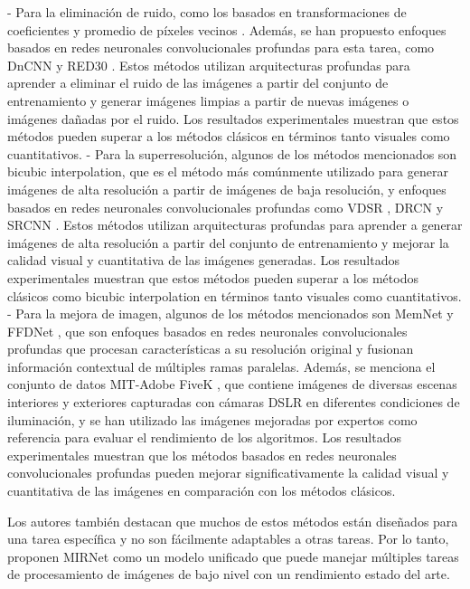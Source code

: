 \documentclass[a4paper,
               ]{jacow}
\begin{document}
- Para la eliminación de ruido, como los basados en transformaciones de coeficientes y promedio de píxeles vecinos \cite{zhang2017beyond}. Además, se han propuesto enfoques basados en redes neuronales convolucionales profundas para esta tarea, como DnCNN \cite{zhang2017beyond} y RED30 \cite{mao2019red30}. Estos métodos utilizan arquitecturas profundas para aprender a eliminar el ruido de las imágenes a partir del conjunto de entrenamiento y generar imágenes limpias a partir de nuevas imágenes o imágenes dañadas por el ruido. Los resultados experimentales muestran que estos métodos pueden superar a los métodos clásicos en términos tanto visuales como cuantitativos.
- Para la superresolución, algunos de los métodos mencionados son bicubic interpolation, que es el método más comúnmente utilizado para generar imágenes de alta resolución a partir de imágenes de baja resolución, y enfoques basados en redes neuronales convolucionales profundas como VDSR \cite{vdsr}, DRCN \cite{kim2016deeply} y SRCNN \cite{dong2016image}. Estos métodos utilizan arquitecturas profundas para aprender a generar imágenes de alta resolución a partir del conjunto de entrenamiento y mejorar la calidad visual y cuantitativa de las imágenes generadas. Los resultados experimentales muestran que estos métodos pueden superar a los métodos clásicos como bicubic interpolation en términos tanto visuales como cuantitativos.
- Para la mejora de imagen,  algunos de los métodos mencionados son MemNet \cite{tai2017memnet} y FFDNet \cite{zhang2018ffdnet}, que son enfoques basados en redes neuronales convolucionales profundas que procesan características a su resolución original y fusionan información contextual de múltiples ramas paralelas. Además, se menciona el conjunto de datos MIT-Adobe FiveK \cite{dabov2007image}, que contiene imágenes de diversas escenas interiores y exteriores capturadas con cámaras DSLR en diferentes condiciones de iluminación, y se han utilizado las imágenes mejoradas por expertos como referencia para evaluar el rendimiento de los algoritmos. Los resultados experimentales muestran que los métodos basados en redes neuronales convolucionales profundas pueden mejorar significativamente la calidad visual y cuantitativa de las imágenes en comparación con los métodos clásicos.

Los autores también destacan que muchos de estos métodos están diseñados para una tarea específica y no son fácilmente adaptables a otras tareas. Por lo tanto, proponen MIRNet como un modelo unificado que puede manejar múltiples tareas de procesamiento de imágenes de bajo nivel con un rendimiento estado del arte.
\end{document}
